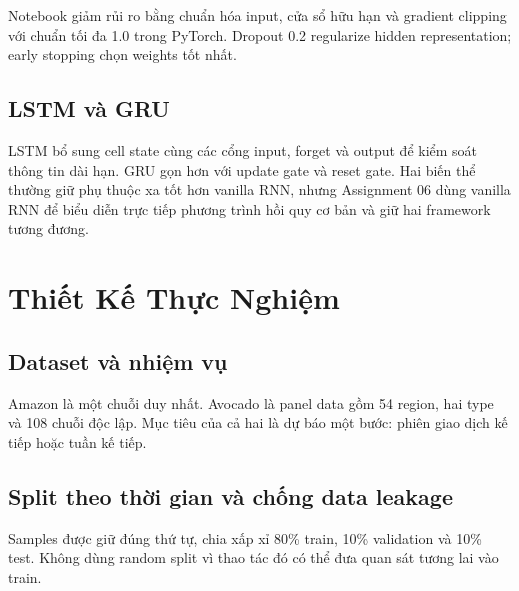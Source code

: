\documentclass[12pt,a4paper]{report}
\begin{document}
Notebook giảm rủi ro bằng chuẩn hóa input, cửa sổ hữu hạn và gradient clipping với chuẩn tối đa 1.0
trong PyTorch. Dropout 0.2 regularize hidden representation; early stopping chọn weights tốt nhất.

\section{LSTM và GRU}
LSTM bổ sung cell state cùng các cổng input, forget và output để kiểm soát thông tin dài hạn.
GRU gọn hơn với update gate và reset gate. Hai biến thể thường giữ phụ thuộc xa tốt hơn vanilla RNN,
nhưng Assignment 06 dùng vanilla RNN để biểu diễn trực tiếp phương trình hồi quy cơ bản và giữ hai
framework tương đương.

\chapter{Thiết Kế Thực Nghiệm}

\section{Dataset và nhiệm vụ}
\begin{table}[H]
\centering
\caption{Tổng quan hai dataset của Assignment 06}
\label{tab:dataset_overview}
\end{table}

Amazon là một chuỗi duy nhất. Avocado là panel data gồm 54 region, hai type và 108 chuỗi độc lập.
Mục tiêu của cả hai là dự báo một bước: phiên giao dịch kế tiếp hoặc tuần kế tiếp.

\section{Split theo thời gian và chống data leakage}
Samples được giữ đúng thứ tự, chia xấp xỉ 80\% train, 10\% validation và 10\% test.
Không dùng random split vì thao tác đó có thể đưa quan sát tương lai vào train.
\end{document}
